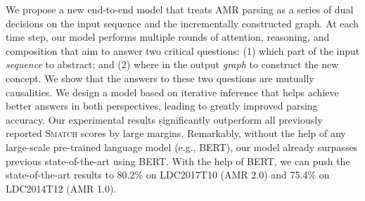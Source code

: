 We propose a new end-to-end model that treats AMR parsing as a series of dual decisions on the input sequence and the incrementally constructed graph. At each time step, our model performs multiple rounds of attention, reasoning, and composition that aim to answer two critical questions: (1) which part of the input \textit{sequence} to abstract; and (2) where in the output \textit{graph} to construct the new concept. We show that the answers to these two questions are mutually causalities. We design a model based on iterative inference that helps achieve better answers in both perspectives, leading to greatly improved parsing accuracy. Our experimental results significantly outperform all previously reported \textsc{Smatch} scores by large margins. Remarkably, without the help of any large-scale pre-trained language model (e.g., BERT), our model already surpasses previous state-of-the-art using BERT. With the help of BERT, we can push the state-of-the-art results to 80.2\% on LDC2017T10 (AMR 2.0) and 75.4\% on LDC2014T12 (AMR 1.0).
